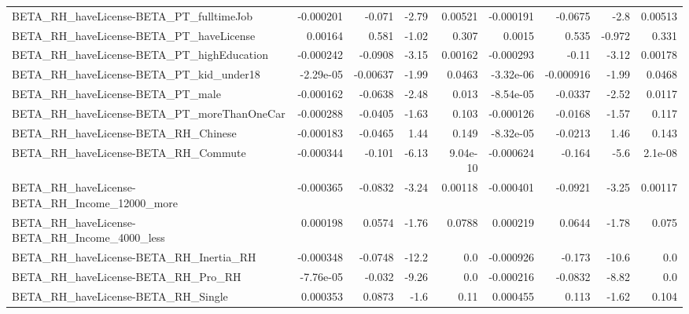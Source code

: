 \begin{tabular}{lrrrrrrrr}
BETA\_RH\_haveLicense-BETA\_PT\_fulltimeJob            &   -0.000201 &       -0.071 &    -2.79 &  0.00521 &  -0.000191 &     -0.0675 &         -2.8 &       0.00513 \\
BETA\_RH\_haveLicense-BETA\_PT\_haveLicense            &     0.00164 &        0.581 &    -1.02 &    0.307 &     0.0015 &       0.535 &       -0.972 &         0.331 \\
BETA\_RH\_haveLicense-BETA\_PT\_highEducation          &   -0.000242 &      -0.0908 &    -3.15 &  0.00162 &  -0.000293 &       -0.11 &        -3.12 &       0.00178 \\
BETA\_RH\_haveLicense-BETA\_PT\_kid\_under18            &   -2.29e-05 &     -0.00637 &    -1.99 &   0.0463 &  -3.32e-06 &   -0.000916 &        -1.99 &        0.0468 \\
BETA\_RH\_haveLicense-BETA\_PT\_male                   &   -0.000162 &      -0.0638 &    -2.48 &    0.013 &  -8.54e-05 &     -0.0337 &        -2.52 &        0.0117 \\
BETA\_RH\_haveLicense-BETA\_PT\_moreThanOneCar         &   -0.000288 &      -0.0405 &    -1.63 &    0.103 &  -0.000126 &     -0.0168 &        -1.57 &         0.117 \\
BETA\_RH\_haveLicense-BETA\_RH\_Chinese                &   -0.000183 &      -0.0465 &     1.44 &    0.149 &  -8.32e-05 &     -0.0213 &         1.46 &         0.143 \\
BETA\_RH\_haveLicense-BETA\_RH\_Commute                &   -0.000344 &       -0.101 &    -6.13 & 9.04e-10 &  -0.000624 &      -0.164 &         -5.6 &       2.1e-08 \\
BETA\_RH\_haveLicense-BETA\_RH\_Income\_12000\_more      &   -0.000365 &      -0.0832 &    -3.24 &  0.00118 &  -0.000401 &     -0.0921 &        -3.25 &       0.00117 \\
BETA\_RH\_haveLicense-BETA\_RH\_Income\_4000\_less       &    0.000198 &       0.0574 &    -1.76 &   0.0788 &   0.000219 &      0.0644 &        -1.78 &         0.075 \\
BETA\_RH\_haveLicense-BETA\_RH\_Inertia\_RH             &   -0.000348 &      -0.0748 &    -12.2 &      0.0 &  -0.000926 &      -0.173 &        -10.6 &           0.0 \\
BETA\_RH\_haveLicense-BETA\_RH\_Pro\_RH                 &   -7.76e-05 &       -0.032 &    -9.26 &      0.0 &  -0.000216 &     -0.0832 &        -8.82 &           0.0 \\
BETA\_RH\_haveLicense-BETA\_RH\_Single                 &    0.000353 &       0.0873 &     -1.6 &     0.11 &   0.000455 &       0.113 &        -1.62 &         0.104 \\

\end{tabular}
